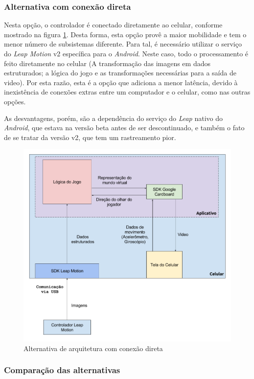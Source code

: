 \subsubsection{Alternativa com conexão direta}\label{subsubsec-arquiteturas-leapmotion-android}

Nesta opção, o controlador é conectado diretamente ao celular, conforme mostrado na figura \ref{fig:arquitetura-leap-android}. Desta forma, esta opção provê a maior mobilidade e tem o menor número de subsistemas diferente. Para tal, é necessário utilizar o serviço do \textit{Leap Motion} v2 específica para o \textit{Android}. Neste caso, todo o processamento é feito diretamente no celular (A transformação das imagens em dados estruturados; a lógica do jogo e as transformações necessárias para a saída de video). Por esta razão, esta é a opção que adiciona a menor latência, devido à inexistência de conexões extras entre um computador e o celular, como nas outras opções.

As desvantagens, porém, são a dependência do serviço do \textit{Leap} nativo do \textit{Android}, que estava na versão beta antes de ser descontinuado, e também o fato de se tratar da versão v2, que tem um rastreamento pior.

\begin{figure}
	\centering
	\includegraphics[width=0.7\linewidth]{images/Arquitetura-leap-android}
	\caption{Alternativa de arquitetura com conexão direta}
	\label{fig:arquitetura-leap-android}
\end{figure}

\subsubsection{Comparação das alternativas}\label{subsubsec-arquiteturas-comparacao}

